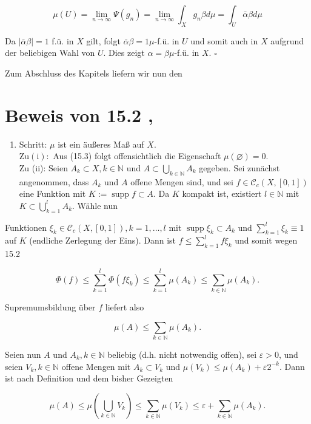 \documentclass[10pt, letterpaper]{article}
\begin{document}
$$
\mu(U)=\lim _{n \rightarrow \infty} \Psi\left(g_{n}\right)=\lim _{n \rightarrow \infty} \int_{X} g_{n} \beta d \mu=\int_{U} \bar{\alpha} \beta d \mu
$$

Da $|\bar{\alpha} \beta|=1$ f.ü. in $X$ gilt, folgt $\bar{\alpha} \beta=1 \mu$-f.ü. in $U$ und somit auch in $X$ aufgrund der beliebigen Wahl von $U$. Dies zeigt $\alpha=\beta \mu$-f.ü. in $X$. \(\square\)

Zum Abschluss des Kapitels liefern wir nun den

\section*{Beweis von 15.2 ,}
\begin{enumerate}
  \item Schritt: $\mu$ ist ein äußeres Maß auf $X$.\\
$\mathrm{Zu}(\mathrm{i}):$ Aus (15.3) folgt offensichtlich die Eigenschaft $\mu(\varnothing)=0$.\\
Zu (ii): Seien $A_{k} \subset X, k \in \mathbb{N}$ und $A \subset \bigcup_{k \in \mathbb{N}} A_{k}$ gegeben. Sei zunächst angenommen, dass $A_{k}$ und $A$ offene Mengen sind, und sei $f \in \mathcal{C}_{c}(X,[0,1])$ eine Funktion mit $K:=\operatorname{supp} f \subset A$. Da $K$ kompakt ist, existiert $l \in \mathbb{N}$ mit $K \subset \bigcup_{k=1}^{l} A_{k}$. Wähle nun
\end{enumerate}

Funktionen $\xi_{k} \in \mathcal{C}_{c}(X,[0,1]), k=1, \ldots, l$ mit $\operatorname{supp} \xi_{k} \subset A_{k}$ und $\sum_{k=1}^{l} \xi_{k} \equiv 1$ auf $K$ (endliche Zerlegung der Eins). Dann ist $f \leq \sum_{k=1}^{l} f \xi_{k}$ und somit wegen 15.2

$$
\Phi(f) \leq \sum_{k=1}^{l} \Phi\left(f \xi_{k}\right) \leq \sum_{k=1}^{l} \mu\left(A_{k}\right) \leq \sum_{k \in \mathbb{N}} \mu\left(A_{k}\right) .
$$

Supremumsbildung über $f$ liefert also

$$
\mu(A) \leq \sum_{k \in \mathbb{N}} \mu\left(A_{k}\right) .
$$

Seien nun $A$ und $A_{k}, k \in \mathbb{N}$ beliebig (d.h. nicht notwendig offen), sei $\varepsilon>0$, und seien $V_{k}, k \in \mathbb{N}$ offene Mengen mit $A_{k} \subset V_{k}$ und $\mu\left(V_{k}\right) \leq \mu\left(A_{k}\right)+\varepsilon 2^{-k}$. Dann ist nach Definition und dem bisher Gezeigten

$$
\mu(A) \leq \mu\left(\bigcup_{k \in \mathbb{N}} V_{k}\right) \leq \sum_{k \in \mathbb{N}} \mu\left(V_{k}\right) \leq \varepsilon+\sum_{k \in \mathbb{N}} \mu\left(A_{k}\right) .
$$
\end{document}
